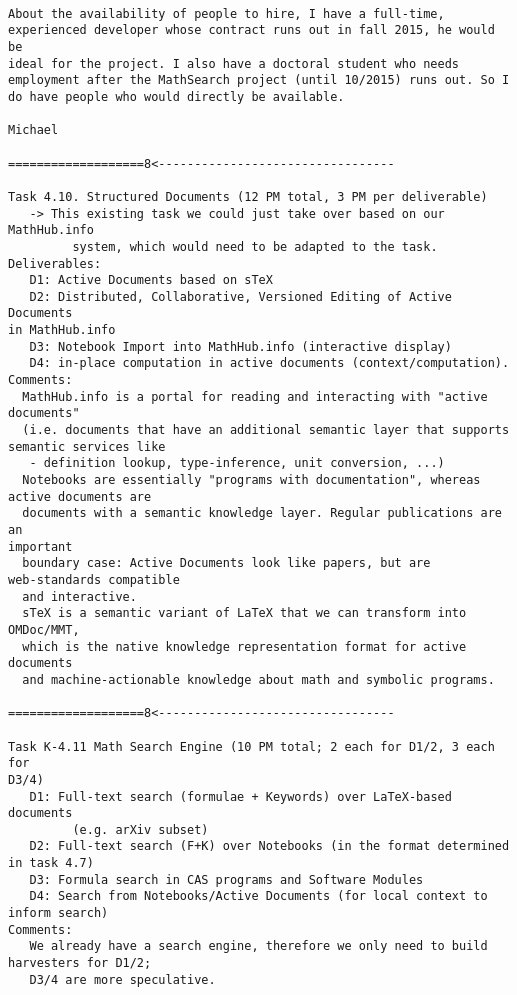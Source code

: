 \begin{verbatim}

About the availability of people to hire, I have a full-time,
experienced developer whose contract runs out in fall 2015, he would be
ideal for the project. I also have a doctoral student who needs
employment after the MathSearch project (until 10/2015) runs out. So I
do have people who would directly be available.

Michael

===================8<---------------------------------

Task 4.10. Structured Documents (12 PM total, 3 PM per deliverable)
   -> This existing task we could just take over based on our MathHub.info
         system, which would need to be adapted to the task.
Deliverables:
   D1: Active Documents based on sTeX
   D2: Distributed, Collaborative, Versioned Editing of Active Documents
in MathHub.info
   D3: Notebook Import into MathHub.info (interactive display)
   D4: in-place computation in active documents (context/computation).
Comments:
  MathHub.info is a portal for reading and interacting with "active
documents"
  (i.e. documents that have an additional semantic layer that supports
semantic services like
   - definition lookup, type-inference, unit conversion, ...)
  Notebooks are essentially "programs with documentation", whereas
active documents are
  documents with a semantic knowledge layer. Regular publications are an
important
  boundary case: Active Documents look like papers, but are
web-standards compatible
  and interactive.
  sTeX is a semantic variant of LaTeX that we can transform into OMDoc/MMT,
  which is the native knowledge representation format for active documents
  and machine-actionable knowledge about math and symbolic programs.

===================8<---------------------------------

Task K-4.11 Math Search Engine (10 PM total; 2 each for D1/2, 3 each for
D3/4)
   D1: Full-text search (formulae + Keywords) over LaTeX-based documents
         (e.g. arXiv subset)
   D2: Full-text search (F+K) over Notebooks (in the format determined
in task 4.7)
   D3: Formula search in CAS programs and Software Modules
   D4: Search from Notebooks/Active Documents (for local context to
inform search)
Comments:
   We already have a search engine, therefore we only need to build
harvesters for D1/2;
   D3/4 are more speculative.

\end{verbatim}

